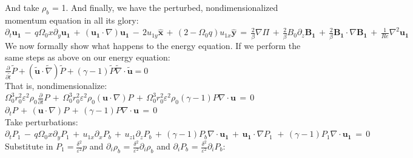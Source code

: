 \documentclass[letterpaper,12pt]{article}
\newcommand\reye{\mathrel{Re}}
\begin{document}
And take $\rho_b$ = 1. And finally, we have the perturbed, nondimensionalized momentum equation in all its glory: \\

$\partial_t \mathbf{u_1} \, - \, q\Omega_0 x \partial_y \mathbf{u_1} \, + \, \left(\mathbf{u_1}\cdot \nabla\right) \mathbf{u_1} \, - \, 2 u_{1y} \mathbf{\hat{x}} \, + \, \left(2 - \Omega_0 q\right)u_{1x}\mathbf{\hat{y}} \, = \, \frac{2}{\beta} \nabla \Pi \, + \, \frac{2}{\beta}B_0\partial_z\mathbf{B_1} \, + \, \frac{2}{\beta}\mathbf{B_1} \cdot \nabla \mathbf{B_1} \,+ \, \frac{1}{\reye}\nabla^2 \mathbf{u_1}$ \\

We now formally show what happens to the energy equation. If we perform the same steps as above on our energy equation: \\

$\frac{\partial}{\partial\widetilde{t}} \widetilde{P} + \left(\widetilde{\mathbf{u}} \cdot \widetilde{\nabla} \right)\widetilde{P} + \left(\gamma -1\right)\widetilde{P} \widetilde{\nabla} \cdot \widetilde{\mathbf{u}} = 0$ \\

That is, nondimensionalize: \\

$\Omega_0^3 r_0^2 \varepsilon^2 \rho_0 \frac{\partial}{\partial t} P \, + \, \Omega_0^3 r_0^2 \varepsilon^2 \rho_0 \left(\mathbf{u} \cdot \nabla \right) P \, + \, \Omega_0^3 r_0^2 \varepsilon^2 \rho_0 \left(\gamma - 1 \right) P \nabla \cdot \mathbf{u} \, = \, 0 $ \\

$\partial_t P \, + \, \left(\mathbf{u} \cdot \nabla \right) P \, + \, \left(\gamma - 1 \right) P \nabla \cdot \mathbf{u} \, = \, 0 $ \\

Take perturbations: \\

$\partial_t P_1 \, - \, q\Omega_0 x \partial_y P_1 \, + \, u_{1x}\partial_x P_b \, + \, u_{z1}\partial_z P_b \, + \, \left(\gamma - 1 \right) P_b \nabla \cdot \mathbf{u_1} \, + \, \mathbf{u_1} \cdot \nabla P_1 \, \, + \, \left(\gamma - 1\right)P_1 \nabla \cdot \mathbf{u_1} \, = \, 0$ \\

Substitute in $P_1 = \frac{\delta^2}{\varepsilon^2} p$ and $\partial_i \rho_b$ = $\frac{\delta^2}{\varepsilon^2} \partial_i \rho_b$ and $\partial_i P_b$ = $\frac{\delta^2}{\varepsilon^2} \partial_i P_b$: \\
\end{document}
